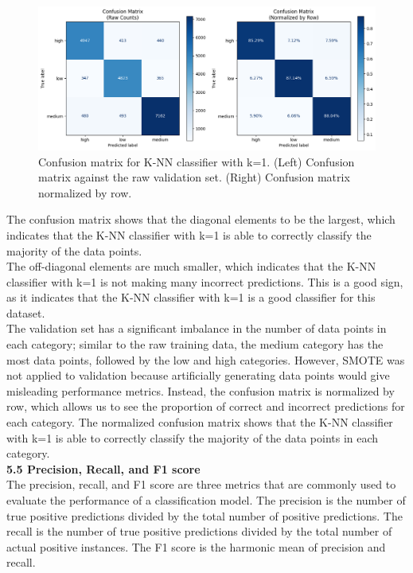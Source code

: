 \documentclass[12pt]{article}
\begin{document}
\begin{figure}[h!]
\centering
\includegraphics[width=1\textwidth]{figures/knn_confusion_matrix.png}
\caption{Confusion matrix for K-NN classifier with k=1. (Left) Confusion matrix against the raw validation set. (Right) Confusion matrix normalized by row.}
\label{fig:knn_confusion_matrix}
\end{figure}

The confusion matrix shows that the diagonal elements to be the largest, which indicates that the K-NN classifier with k=1 is able to correctly classify the majority of the data points.
\\
The off-diagonal elements are much smaller, which indicates that the K-NN classifier with k=1 is not making many incorrect predictions. This is a good sign, as it indicates that the K-NN classifier with k=1 is a good classifier for this dataset.
\\
The validation set has a significant imbalance in the number of data points in each category; similar to the raw training data, the medium category has the most data points, followed by the low and high categories. However, SMOTE was not applied to validation because artificially generating data points would give misleading performance metrics. Instead, the confusion matrix is normalized by row, which allows us to see the proportion of correct and incorrect predictions for each category. The normalized confusion matrix shows that the K-NN classifier with k=1 is able to correctly classify the majority of the data points in each category.
\\

\textbf{5.5 Precision, Recall, and F1 score}
\\
The precision, recall, and F1 score are three metrics that are commonly used to evaluate the performance of a classification model. The precision is the number of true positive predictions divided by the total number of positive predictions. The recall is the number of true positive predictions divided by the total number of actual positive instances. The F1 score is the harmonic mean of precision and recall.
\end{document}
